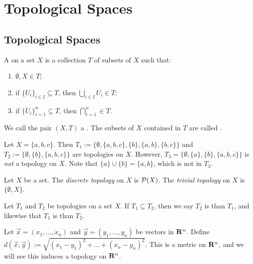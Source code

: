 \chapter{Topological Spaces}

\section{Topological Spaces}
\begin{definition}\label{def:topology}
    A  on a set $X$ is a collection $T$ of subsets of $X$ such that:
        \begin{enumerate}[label = (\arabic*),itemsep=1pt,topsep=3pt]
            \item $\emptyset, X \in T$;
            \item if $\{U_i\}_{i \in I} \subseteq T$, then $\bigcup_{i \in I}U_i \in T$;
            \item if $\{U_i\}_{i = 1}^n \subseteq T$, then $\bigcap_{i = 1}^n \in T$.
        \end{enumerate}
    We call the pair $(X,T)$ a . The subsets of $X$ contained in $T$ are called .
\end{definition}

\begin{example}
    Let $X = \{a,b,c\}$. Then $T_1 := \{\emptyset, \{a,b,c\},\{b\},\{a,b\},\{b,c\}\}$ and $T_2 := \{\emptyset,\{b\},\{a,b,c\}\}$ are topologies on $X$. However, $T_3 =\{\emptyset, \{a\},\{b\},\{a,b,c\}\}$ is \textit{not} a topology on $X.$ Note that $\{a\} \cup \{b\} = \{a,b\}$, which is not in $T_3$.
\end{example}

\begin{example}
    Let $X$ be a set. The \textit{discrete topology} on $X$ is $\mathcal{P}(X)$. The \textit{trivial topology} on $X$ is $\{\emptyset, X\}$.
\end{example}

\begin{definition}
    Let $T_1$ and $T_2$ be topologies on a set $X$. If $T_1 \subseteq T_2$, then we say $T_2$ is  than $T_1$, and likewise that $T_1$ is  than $T_2$.
\end{definition}

\begin{example}\label{example:metric-on-Rn}
    Let $\vec{x} = (x_1,...,x_n)$ and $\vec{y} = (y_1,...,y_n)$ be vectors in $\mathbf{R}^n$. Define $d(\vec{x},\vec{y}) := \sqrt{(x_1-y_1)^2 + ... + (x_n - y_n)^2}$. This is a metric on $\mathbf{R}^n$, and we will see this induces a topology on $\mathbf{R}^n$.
\end{example}

